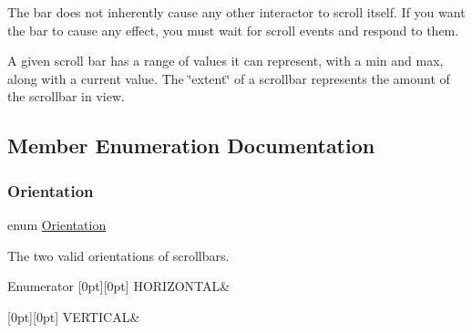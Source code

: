 The bar does not inherently cause any other interactor to scroll itself. If you want the bar to cause any effect, you must wait for scroll events and respond to them.

A given scroll bar has a range of values it can represent, with a min and max, along with a current value. The \char`\"{}extent\char`\"{} of a scrollbar represents the amount of the scrollbar in view. 

\subsection{Member Enumeration Documentation}
\mbox{\label{classGScrollBar_a871118a09520247c78a71ecd7b0abd58}} 
\subsubsection{\texorpdfstring{Orientation}{Orientation}}
{\footnotesize\ttfamily enum \mbox{\hyperlink{classGScrollBar_a871118a09520247c78a71ecd7b0abd58}{Orientation}}}



The two valid orientations of scrollbars. 

\begin{DoxyEnumFields}{Enumerator}
[0pt][0pt]{}\mbox{\label{classGScrollBar_a871118a09520247c78a71ecd7b0abd58a4dd51ad73508d6fc83a502966779e48e}} 
H\+O\+R\+I\+Z\+O\+N\+T\+AL&\\
\hline

[0pt][0pt]{}\mbox{\label{classGScrollBar_a871118a09520247c78a71ecd7b0abd58a1a88641fcd39f2ed3e58a18526e97138}} 
V\+E\+R\+T\+I\+C\+AL&\\
\hline

\end{DoxyEnumFields}
\mbox{\label{classGInteractor_a8e0d441725a81d2bbdebbea09078260e}} 

